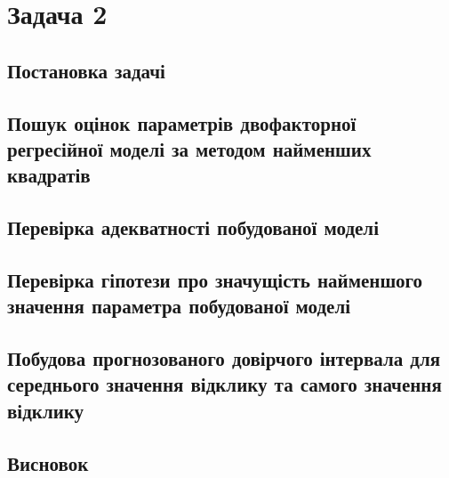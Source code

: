 \documentclass[14pt,a4paper]{scrartcl}
\theoremstyle{definition}
\theoremstyle{remark}
\theoremstyle{definition}
\theoremstyle{definition}
\begin{document}
\section{Задача 2}

\subsection{Постановка задачі}

\subsection{Пошук оцінок параметрів двофакторної регресійної моделі за методом найменших квадратів}

\subsection{Перевірка адекватності побудованої моделі}

\subsection{Перевірка гіпотези про значущість найменшого значення параметра побудованої моделі}

\subsection{Побудова прогнозованого довірчого інтервала для середнього значення відклику та самого значення відклику}

\subsection{Висновок}

\nocite{*}


\end{document}
